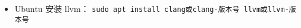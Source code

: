 
\begin{issues}
\issueDraft
\end{issues}


\begin{itemize}
\item Ubuntu 安装 llvm： \verb|sudo apt install clang或clang-版本号 llvm或llvm-版本号|
\end{itemize}
